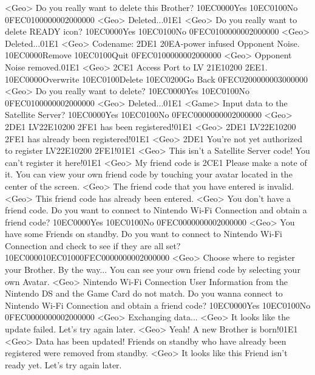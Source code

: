 <Geo> Do you really want to delete this Brother? {10}{EC}{00}{00}Yes {10}{EC}{01}{00}No {0F}{EC}{01}{00}{00}{00}{02}{00}{00}{00}
<Geo> Deleted...{01}{E1}
<Geo> Do you really want to delete READY icon? {10}{EC}{00}{00}Yes {10}{EC}{01}{00}No {0F}{EC}{01}{00}{00}{00}{02}{00}{00}{00}
<Geo> Deleted...{01}{E1}
<Geo> Codename: {2D}{E1} {20}{EA}-power infused Opponent Noise. {10}{EC}{00}{00}Remove {10}{EC}{01}{00}Quit {0F}{EC}{01}{00}{00}{00}{02}{00}{00}{00}
<Geo> Opponent Noise removed.{01}{E1}
<Geo> {2C}{E1} Access Port to LV {21}{E1}{02}{00} {2E}{E1}. {10}{EC}{00}{00}Overwrite {10}{EC}{01}{00}Delete {10}{EC}{02}{00}Go Back {0F}{EC}{02}{00}{00}{00}{03}{00}{00}{00}
<Geo> Do you really want to delete? {10}{EC}{00}{00}Yes {10}{EC}{01}{00}No {0F}{EC}{01}{00}{00}{00}{02}{00}{00}{00}
<Geo> Deleted...{01}{E1}
<Game> Input data to the Satellite Server? {10}{EC}{00}{00}Yes {10}{EC}{01}{00}No {0F}{EC}{00}{00}{00}{00}{02}{00}{00}{00}
<Geo> {2D}{E1} LV{22}{E1}{02}{00} {2F}{E1} has been registered!{01}{E1}
<Geo> {2D}{E1} LV{22}{E1}{02}{00} {2F}{E1} has already been registered!{01}{E1}
<Geo> {2D}{E1} You're not yet authorized to register LV{22}{E1}{02}{00} {2F}{E1}!{01}{E1}
<Geo> This isn't a Satellite Server code! You can't register it here!{01}{E1}
<Geo> My friend code is {2C}{E1} Please make a note of it. 
You can view your own friend code by touching 
your avatar located in the center of the screen. 
<Geo> The friend code that you have entered is invalid. 
<Geo> This friend code has already been entered. 
<Geo> You don't have a friend code. Do you want to connect to 
Nintendo Wi-Fi Connection and obtain a friend code? {10}{EC}{00}{00}Yes {10}{EC}{01}{00}No {0F}{EC}{00}{00}{00}{00}{02}{00}{00}{00}
<Geo> You have some Friends on standby. 
Do you want to connect to Nintendo Wi-Fi Connection and check to 
see if they are all set? 
{10}{EC}{00}{00}{10}{EC}{01}{00}{0F}{EC}{00}{00}{00}{00}{02}{00}{00}{00}
<Geo> Choose where to register your Brother. 
By the way... You can see your own friend code by 
selecting your own Avatar. 
<Geo> Nintendo Wi-Fi Connection User Information from the 
Nintendo DS and the Game Card do not match. Do you wanna connect 
to Nintendo Wi-Fi Connection and obtain a friend code? {10}{EC}{00}{00}Yes {10}{EC}{01}{00}No {0F}{EC}{00}{00}{00}{00}{02}{00}{00}{00}
<Geo> Exchanging data...
<Geo> It looks like the update failed. Let's try again later. 
<Geo> Yeah! A new Brother is born!{01}{E1}
<Geo> Data has been updated! Friends on standby who have already 
been registered were removed from standby. 
<Geo> It looks like this Friend isn't ready yet. Let's try again later. 
